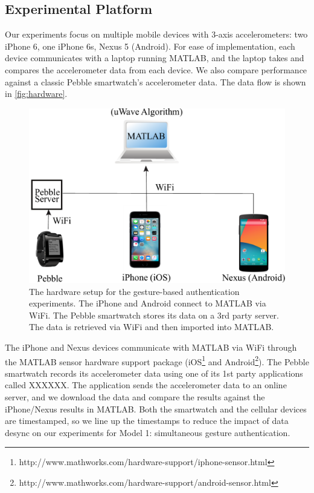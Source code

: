 
\subsection{Experimental Platform}
\label{sec:Tooling}

Our experiments focus on multiple mobile devices with 3-axis accelerometers: two iPhone 6, one iPhone 6s, Nexus 5 (Android). For ease of implementation, each device communicates with a laptop running MATLAB, and the laptop takes and compares the accelerometer data from each device. We also compare performance against a classic Pebble smartwatch's accelerometer data. The data flow is shown in \autoref{fig:hardware}.

\begin{figure}[!tb]
\centering
\includegraphics[width=0.9 \linewidth]{./figures/hardware_composition.pdf}
\caption{The hardware setup for the gesture-based authentication experiments. The iPhone and Android connect to MATLAB via WiFi. The Pebble smartwatch stores its data on a 3rd party server. The data is retrieved via WiFi and then imported into MATLAB.}
\label{fig:hardware}
\end{figure}

The iPhone and Nexus devices communicate with MATLAB via WiFi through the MATLAB sensor hardware support package (iOS\footnote{http://www.mathworks.com/hardware-support/iphone-sensor.html} and Android\footnote{http://www.mathworks.com/hardware-support/android-sensor.html}). The Pebble smartwatch records its accelerometer data using one of its 1st party applications called XXXXXX. The application sends the accelerometer data to an online server, and we download the data and compare the results against the iPhone/Nexus results in MATLAB. Both the smartwatch and the cellular devices are timestamped, so we line up the timestamps to reduce the impact of data desync on our experiments for Model 1: simultaneous gesture authentication. 

